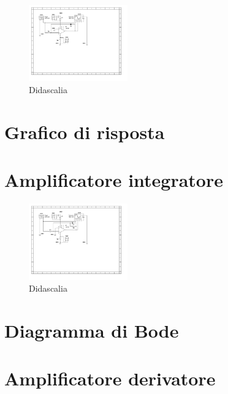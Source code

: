 \documentclass[journal]{IEEEtran}
\begin{document}
\begin{figure}[H]%
\begin {center}
\includegraphics[width=0.38\textwidth]{sch-simulations/output/OPA-log.pdf}
\caption{Didascalia}
\label{fig:oscilloscope}
\end {center}
\end{figure}

\section{Grafico di risposta}


\section{Amplificatore integratore} %

\begin{figure}[H]%
\begin {center}
\includegraphics[width=0.38\textwidth]{sch-simulations/output/OPA-integratore.pdf}
\caption{Didascalia}
\label{fig:oscilloscope}
\end {center}
\end{figure}

\section{Diagramma di Bode}


\section{Amplificatore derivatore} %
\end{document}
